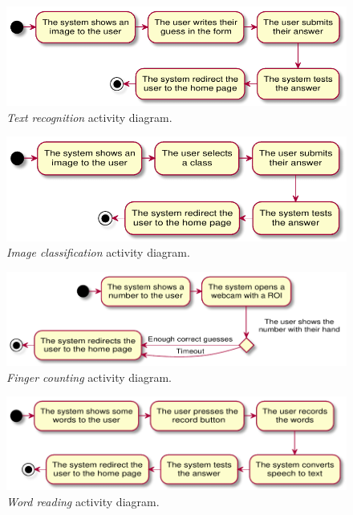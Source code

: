 \begin{figure}[h!t]
    \centering
    \includegraphics[scale=0.8]{assets/plantuml/pdf/activity/text.pdf}
    \caption{\emph{Text recognition} activity diagram.}
    \label{fig:activity:text}
\end{figure}

\begin{figure}[h!t]
    \centering
    \includegraphics[scale=0.8]{assets/plantuml/pdf/activity/image.pdf}
    \caption{\emph{Image classification} activity diagram.}
    \label{fig:activity:image}
\end{figure}

\begin{figure}[h!t]
    \centering
    \includegraphics[scale=0.8]{assets/plantuml/pdf/activity/finger.pdf}
    \caption{\emph{Finger counting} activity diagram.}
    \label{fig:activity:finger}
\end{figure}

\begin{figure}[h!t]
    \centering
    \includegraphics[scale=0.8]{assets/plantuml/pdf/activity/word.pdf}
    \caption{\emph{Word reading} activity diagram.}
    \label{fig:activity:word}
\end{figure}

